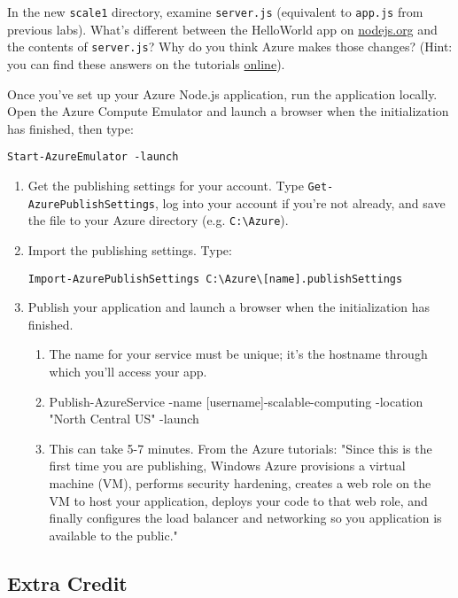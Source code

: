 \documentclass{article}
\begin{document}
 In the new \verb!scale1! directory, examine \verb!server.js! (equivalent to \verb!app.js! from previous labs). What's different between the HelloWorld app on \href{http://nodejs.org}{nodejs.org} and the contents of \verb!server.js!? Why do you think Azure makes those changes? (Hint: you can find these answers on the tutorials \href{http://www.windowsazure.com/en-us/develop/nodejs/}{online}).

Once you've set up your Azure Node.js application, run the application locally. Open the Azure Compute Emulator and launch a browser when the initialization has finished, then type:

\begin{verbatim}
Start-AzureEmulator -launch
\end{verbatim}


\begin{enumerate}
\item Get the publishing settings for your account. Type \verb!Get-AzurePublishSettings!, log into your account if you're not already, and save the file to your Azure directory (e.g. \verb!C:\Azure!).
\item Import the publishing settings. Type:
\begin{verbatim}
Import-AzurePublishSettings C:\Azure\[name].publishSettings
\end{verbatim}
\item Publish your application and launch a browser when the initialization has finished.
\begin{enumerate}
\item The name for your service must be unique; it's the hostname through which you'll access your app.
\item Publish-AzureService -name [username]-scalable-computing -location "North Central US" -launch
\item This can take 5-7 minutes. From the Azure tutorials: "Since this is the first time you are publishing, Windows Azure provisions a virtual machine (VM), performs security hardening, creates a web role on the VM to host your application, deploys your code to that web role, and finally configures the load balancer and networking so you application is available to the public."
\end{enumerate}
\end{enumerate}

\subsection*{Extra Credit}
\end{document}
